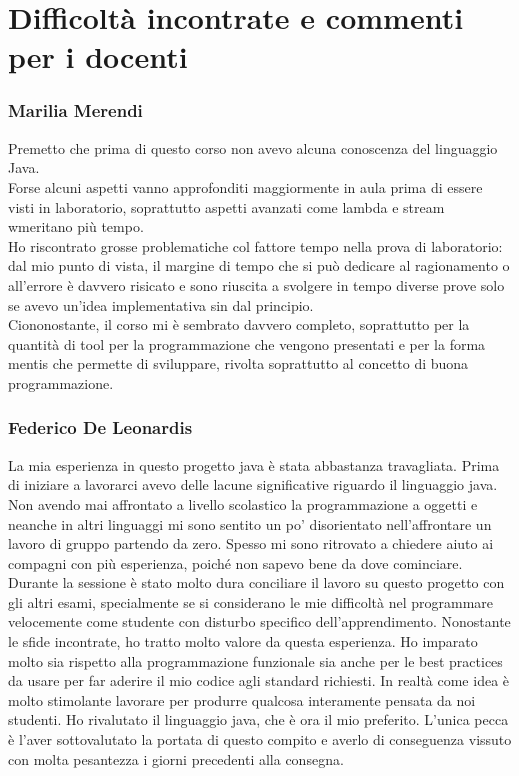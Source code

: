 \documentclass[a4paper,12pt]{report}
\begin{document}
\section{Difficoltà incontrate e commenti per i docenti}
\subsubsection{Marilia Merendi}
Premetto che prima di questo corso non avevo alcuna conoscenza del linguaggio Java. \\
%
Forse alcuni aspetti vanno approfonditi maggiormente in aula prima di essere visti in laboratorio, soprattutto aspetti avanzati come lambda e stream wmeritano più tempo. \\
%
Ho riscontrato grosse problematiche col fattore tempo nella prova di laboratorio: dal mio punto di vista, il margine di tempo che si può dedicare al ragionamento o all’errore è davvero risicato e sono riuscita a svolgere in tempo diverse prove solo se avevo un’idea implementativa sin dal principio. \\
%
Ciononostante, il corso mi è sembrato davvero completo, soprattutto per la quantità di tool per la programmazione che vengono presentati e per la forma mentis che permette di sviluppare, rivolta soprattutto al concetto di buona programmazione.
%
\subsubsection{Federico De Leonardis}
La mia esperienza in questo progetto java è stata abbastanza travagliata. 
%
Prima di iniziare a lavorarci avevo delle lacune significative riguardo il linguaggio java. 
%
Non avendo mai affrontato a livello scolastico la programmazione a oggetti e neanche in altri linguaggi mi sono sentito un po’ disorientato nell’affrontare un lavoro di gruppo partendo da zero. 
%
Spesso mi sono ritrovato a chiedere aiuto ai compagni con più esperienza, poiché non sapevo bene da dove cominciare. 
%
Durante  la sessione è stato molto dura conciliare il lavoro su questo progetto con gli altri esami, specialmente se si considerano le mie difficoltà nel programmare velocemente come studente con disturbo specifico dell'apprendimento. 
%
Nonostante le sfide incontrate, ho tratto molto valore da questa esperienza. 
%
Ho imparato molto sia rispetto alla programmazione funzionale sia anche per le best practices da usare per far aderire il mio codice agli standard richiesti. 
%
In realtà come idea è molto stimolante lavorare per produrre qualcosa interamente pensata da noi studenti. 
%
Ho rivalutato il linguaggio java, che è ora il mio preferito. 
%
L’unica pecca è l’aver sottovalutato la portata di questo compito e averlo di conseguenza vissuto con molta pesantezza i giorni precedenti alla consegna.
\end{document}
